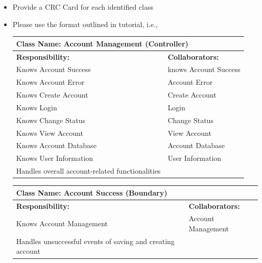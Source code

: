 \documentclass[]{article}
\begin{document}
\begin{itemize}
	\item Provide a CRC Card for each identified class
	\item Please use the format outlined in tutorial, i.e., 
 
	\begin{table}[ht]
		\centering
		\begin{tabular}{|p{7cm}|p{7cm}|}
		\hline 
		 \multicolumn{2}{|l|}{\textbf{Class Name:} Account Management (Controller)} \\
		\hline
		\textbf{Responsibility:} & \textbf{Collaborators:} \\
		\hline
		Knows Account Success & knows Account Success\\
		Knows Account Error & Account Error \\
		Knows Create Account & Create Account\\
		Knows Login & Login\\
		Knows Change Status & Change Status\\
		Knows View Account & View Account\\
		Knows Account Database & Account Database\\
		Knows User Information &User Information\\
		Handles overall account-related functionalities
		\vspace{0.1in} & \\
		\hline
		\end{tabular}
	\end{table}

	\begin{table}[ht]
		\centering
		\begin{tabular}{|p{7cm}|p{7cm}|}
		\hline 
		 \multicolumn{2}{|l|}{\textbf{Class Name:} Account Success (Boundary)} \\
		\hline
		\textbf{Responsibility:} & \textbf{Collaborators:} \\
		\hline
		Knows Account Management & Account Management\\
		Handles unsuccessful events of saving and creating account
		\vspace{0.1in} & \\
		\hline
		\end{tabular}
	\end{table}


\end{itemize}
\end{document}

